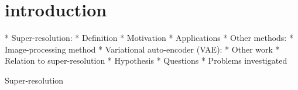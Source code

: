 \section{introduction}
\label{sec:introduction}

* Super-resolution:
	* Definition
	* Motivation
	* Applications
	* Other methods:
		* Image-processing method
* Variational auto-encoder (VAE):
	* Other work
	* Relation to super-resolution
		* Hypothesis
		* Questions
		* Problems investigated

Super-resolution  